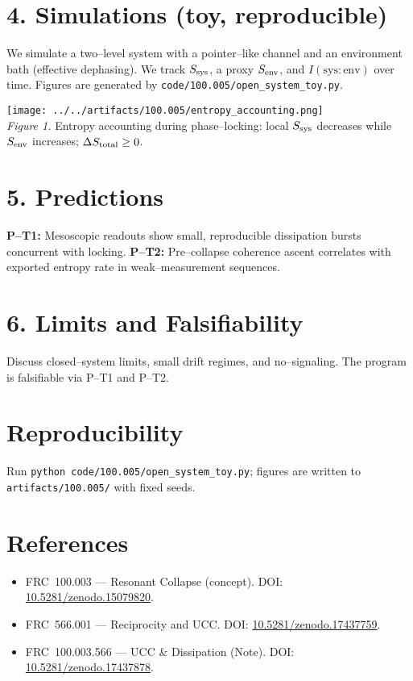 \documentclass[10pt]{article}
\begin{document}
\section*{4. Simulations (toy, reproducible)}
We simulate a two--level system with a pointer--like channel and an environment bath (effective dephasing). We track $S_{\rm sys}$, a proxy $S_{\rm env}$, and $I(\mathrm{sys:env})$ over time. Figures are generated by \verb|code/100.005/open_system_toy.py|.

\begin{center}
\texttt{[image: ../../artifacts/100.005/entropy\_accounting.png]}\\
\emph{Figure 1.} Entropy accounting during phase--locking: local $S_{\rm sys}$ decreases while $S_{\rm env}$ increases; $\Delta S_{\rm total}\ge 0$.
\end{center}

\section*{5. Predictions}
\textbf{P--T1:} Mesoscopic readouts show small, reproducible dissipation bursts concurrent with locking.\newline
\textbf{P--T2:} Pre--collapse coherence ascent correlates with exported entropy rate in weak--measurement sequences.

\section*{6. Limits and Falsifiability}
Discuss closed--system limits, small drift regimes, and no--signaling. The program is falsifiable via P--T1 and P--T2.

\section*{Reproducibility}
Run \verb|python code/100.005/open_system_toy.py|; figures are written to \verb|artifacts/100.005/| with fixed seeds.

\section*{References}
\small
\begin{itemize}
  \item FRC~100.003 — Resonant Collapse (concept). DOI: \href{https://doi.org/10.5281/zenodo.15079820}{10.5281/zenodo.15079820}.
  \item FRC~566.001 — Reciprocity and UCC. DOI: \href{https://doi.org/10.5281/zenodo.17437759}{10.5281/zenodo.17437759}.
  \item FRC~100.003.566 — UCC \& Dissipation (Note). DOI: \href{https://doi.org/10.5281/zenodo.17437878}{10.5281/zenodo.17437878}.
\end{itemize}
\end{document}
